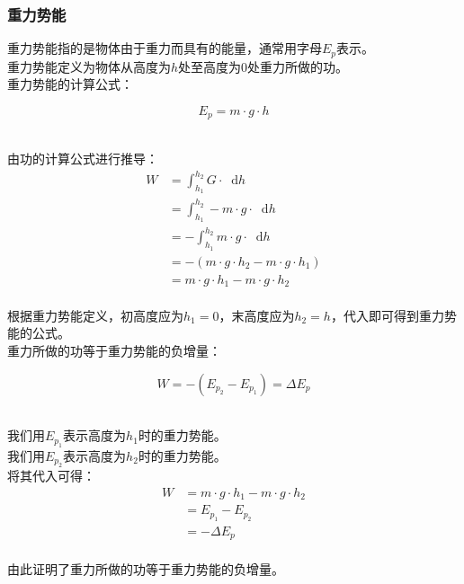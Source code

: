 \documentclass[UTF8]{ctexart}
\newcommand*{\dif}{\mathop{}\!\mathrm{d}}
\begin{document}
\newpage

\subsubsection{重力势能}
    重力势能指的是物体由于重力而具有的能量，通常用字母$E_p$表示。\\[3mm]
    重力势能定义为物体从高度为$h$处至高度为$0$处重力所做的功。\\[3mm]
    重力势能的计算公式：
    \begin{large}
        \begin{equation*}
            E_p=m\cdot g\cdot h
        \end{equation*}
    \end{large}\\
    由功的计算公式进行推导：
    \setcounter{equation}{0}
    \begin{align}
        W
        &=\int_{h_1}^{h_2}G\cdot\dif h\\[3mm]
        &=\int_{h_1}^{h_2}-m\cdot g\cdot\dif h\\[3mm]
        &=-\int_{h_1}^{h_2}m\cdot g\cdot\dif h\\[3mm]
        &=-(m\cdot g\cdot h_2-m\cdot g\cdot h_1)\\[3mm]
        &=m\cdot g\cdot h_1-m\cdot g\cdot h_2
    \end{align}\\
    根据重力势能定义，初高度应为$h_1=0$，末高度应为$h_2=h$，代入即可得到重力势能的公式。\\[12mm]
    重力所做的功等于重力势能的负增量：
    \begin{large}
        \begin{equation*}
            W=-(E_{p_2}-E_{p_1})=\Delta E_p
        \end{equation*}
    \end{large}\\
    我们用$E_{p_1}$表示高度为$h_1$时的重力势能。\\[3mm]
    我们用$E_{p_2}$表示高度为$h_2$时的重力势能。\\[3mm]
    将其代入可得：
    \begin{align}
        W
        &=m\cdot g\cdot h_1-m\cdot g\cdot h_2\\[3mm]
        &=E_{p_1}-E_{p_2}\\[3mm]
        &=-\Delta E_p
    \end{align}\\
    由此证明了重力所做的功等于重力势能的负增量。
\end{document}
